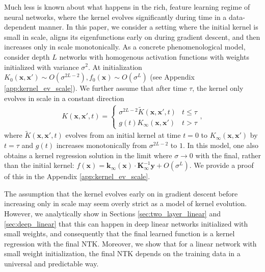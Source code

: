 \documentclass{article} %
\def\x{\bm x}
\newcommand{\cep}[1]{\textcolor{purple}{[Cengiz: #1]}}
\newcommand{\aba}[1]{\textcolor{blue}{[Alex: #1]}}
\begin{document}
Much less is known about what happens in the rich, feature learning regime of neural networks, where the kernel evolves significantly during time in a data-dependent manner. In this paper, we consider a setting where the initial kernel is small in scale, aligns its eigenfunctions early on during gradient descent, and then increases only in scale monotonically. As a concrete phenomenological model, consider depth $L$ networks with homogenous activation functions with weights initialized with variance $\sigma^2$. At initialization $K_0(\x,\x') \sim O(\sigma^{2L-2}) , f_0(\x) \sim O(\sigma^L)$ (see Appendix \ref{app:kernel_ev_scale}). We further assume that after time $\tau$, the kernel only evolves in scale in a constant direction
\begin{align}
    K(\x,\x',t) = \begin{cases} 
      \sigma^{2L-2} \tilde K(\x,\x',t) & t \leq \tau \\
      g(t) K_{\infty}(\x,\x') & t > \tau
   \end{cases},
\end{align}
where $\tilde K(\x,\x',t)$ evolves from an initial kernel at time $t=0$ to $K_{\infty}(\x,\x')$ by $t = \tau$ and $g(t)$ increases monotonically from $\sigma^{2L-2}$ to $1$. In this model, one also obtains a kernel regression solution in the limit where $\sigma \to 0$ with the final, rather than the initial kernel: $f(\x) = \bm k_{\infty}(\x) \cdot \bm K_{\infty}^{-1} \bm y + O(\sigma^{L})$. We provide a proof of this in the Appendix \ref{app:kernel_ev_scale}. 


The assumption that the kernel evolves early on in gradient descent before increasing only in scale may seem overly strict as a model of kernel evolution. However, we analytically show in Sections \ref{sec:two_layer_linear} and \ref{sec:deep_linear}  that this can happen in deep linear networks initialized with small weights, and consequently that the final learned function is a kernel regression with the final NTK. Moreover, we show that for a linear network with small weight initialization, the final NTK depends on the training data in a universal and predictable way.
\end{document}

